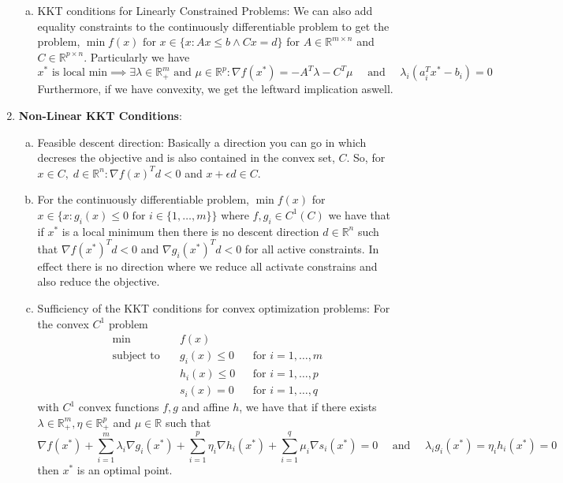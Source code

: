 \documentclass{article}
\begin{document}
\begin{enumerate}
\begin{enumerate}[a.]
        \item KKT conditions for Linearly Constrained Problems: We can also add equality constraints to the continuously differentiable problem to get the problem, \(\min f(x) \text{ for } x \in \{x : Ax\leq b \wedge Cx = d\}\) for \(A \in \mathbb{R}^{m \times n}\) and \(C \in \mathbb{R}^{p \times n}\). Particularly we have
        \[
        x^* \text{ is local min} \implies \exists \lambda \in \mathbb{R}^m_+ \text{ and } \mu \in \mathbb{R}^p : \nabla f(x^*) = -A^T\lambda - C^T\mu\quad \text{ and } \quad 
        \lambda_i(a_i^Tx^* - b_i) = 0
        \]
        Furthermore, if we have convexity, we get the leftward implication aswell.
    \end{enumerate}
    \item \textbf{Non-Linear KKT Conditions}: 
    \begin{enumerate}[a.]
        \item Feasible descent direction: Basically a direction you can go in which decreses the objective and is also contained in the convex set, \(C\). So, for \(x \in C, \;d \in \mathbb{R}^n : \nabla f(x)^T d < 0\) and \(x + \epsilon d \in C\).
        \item For the continuously differentiable problem, \(\min f(x)\) for \( x\in \{x: g_i(x)\leq 0 \text{ for } i \in \{1, \dots, m\}\}\) where \(f, g_i \in C^1(C)\) we have that if \(x^*\) is a local minimum then there is no descent direction \(d \in \mathbb{R}^n\) such that \(\nabla f(x^*)^Td< 0\) and \(\nabla g_i(x^*)^T d<0\) for all active constraints. In effect there is no direction where we reduce all activate constrains and also reduce the objective.
        \item Sufficiency of the KKT conditions for convex optimization problems:
        For the convex \(C^1\) problem
        \[
        \begin{aligned}
        \min\quad & f(x) \\
        \text{subject to} \quad & g_i(x) \leq 0 && \text{for } i = 1, \dots, m \\
        & h_i(x) \leq 0 && \text{for } i = 1, \dots, p \\
        & s_i(x) = 0 && \text{for } i = 1, \dots, q
        \end{aligned}
        \]
        with \(C^1\) convex functions \(f, g\) and affine \(h\), we have that if there exists \(\lambda \in \mathbb{R}^m_+, \eta \in \mathbb{R}^p_+\) and \(\mu \in \mathbb{R}\) such that 
        \[
        \nabla f(x^*) + \sum_{i = 1}^{m} \lambda_i \nabla g_i(x^*) + \sum_{i = 1}^{p} \eta_i \nabla h_i(x^*) + \sum_{i = 1}^{q} \mu_i \nabla s_i(x^*) = 0 \quad \text{ and } \quad \lambda_i g_i(x^*) = \eta_ih_i(x^*) = 0
        \]
        then \(x^*\) is an optimal point.


\end{enumerate}
\end{enumerate}
\end{document}
